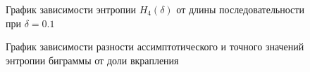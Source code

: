 ﻿\documentclass[a4paper,12pt]{article}
\theoremstyle{plain}
\begin{document}
					\begin{figure}[h]
						\caption{График зависимости энтропии $H_4{(\delta)}$ от длины последовательности при  $\delta = 0.1$}
						\label{ris:"h4_01.png"}
					\end{figure}
						\begin{figure}[h]
							\caption{График зависимости разности ассимптотического и точного значений энтропии биграммы от доли вкрапления}
							\label{ris:"h4.png"}
						\end{figure}
					
\end{document}
